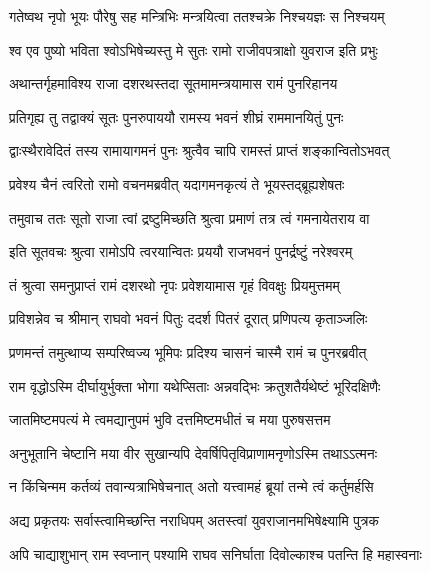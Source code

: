 
\twolineshloka
{गतेष्वथ नृपो भूयः पौरेषु सह मन्त्रिभिः}
{मन्त्रयित्वा ततश्चक्रे निश्चयज्ञः स निश्चयम्} %

\twolineshloka
{श्व एव पुष्यो भविता श्वोऽभिषेच्यस्तु मे सुतः}
{रामो राजीवपत्राक्षो युवराज इति प्रभुः} %

\twolineshloka
{अथान्तर्गृहमाविश्य राजा दशरथस्तदा}
{सूतमामन्त्रयामास रामं पुनरिहानय} %

\twolineshloka
{प्रतिगृह्य तु तद्वाक्यं सूतः पुनरुपाययौ}
{रामस्य भवनं शीघ्रं राममानयितुं पुनः} %

\twolineshloka
{द्वाःस्थैरावेदितं तस्य रामायागमनं पुनः}
{श्रुत्वैव चापि रामस्तं प्राप्तं शङ्कान्वितोऽभवत्} %

\twolineshloka
{प्रवेश्य चैनं त्वरितो रामो वचनमब्रवीत्}
{यदागमनकृत्यं ते भूयस्तद्ब्रूह्यशेषतः} %

\twolineshloka
{तमुवाच ततः सूतो राजा त्वां द्रष्टुमिच्छति}
{श्रुत्वा प्रमाणं तत्र त्वं गमनायेतराय वा} %

\twolineshloka
{इति सूतवचः श्रुत्वा रामोऽपि त्वरयान्वितः}
{प्रययौ राजभवनं पुनर्द्रष्टुं नरेश्वरम्} %

\twolineshloka
{तं श्रुत्वा समनुप्राप्तं रामं दशरथो नृपः}
{प्रवेशयामास गृहं विवक्षुः प्रियमुत्तमम्} %

\twolineshloka
{प्रविशन्नेव च श्रीमान् राघवो भवनं पितुः}
{ददर्श पितरं दूरात् प्रणिपत्य कृताञ्जलिः} %

\twolineshloka
{प्रणमन्तं तमुत्थाप्य सम्परिष्वज्य भूमिपः}
{प्रदिश्य चासनं चास्मै रामं च पुनरब्रवीत्} %

\twolineshloka
{राम वृद्धोऽस्मि दीर्घायुर्भुक्ता भोगा यथेप्सिताः}
{अन्नवद्भिः क्रतुशतैर्यथेष्टं भूरिदक्षिणैः} %

\twolineshloka
{जातमिष्टमपत्यं मे त्वमद्यानुपमं भुवि}
{दत्तमिष्टमधीतं च मया पुरुषसत्तम} %

\twolineshloka
{अनुभूतानि चेष्टानि मया वीर सुखान्यपि}
{देवर्षिपितृविप्राणामनृणोऽस्मि तथाऽऽत्मनः} %

\twolineshloka
{न किंचिन्मम कर्तव्यं तवान्यत्राभिषेचनात्}
{अतो यत्त्वामहं ब्रूयां तन्मे त्वं कर्तुमर्हसि} %

\twolineshloka
{अद्य प्रकृतयः सर्वास्त्वामिच्छन्ति नराधिपम्}
{अतस्त्वां युवराजानमभिषेक्ष्यामि पुत्रक} %

\twolineshloka
{अपि चाद्याशुभान् राम स्वप्नान् पश्यामि राघव}
{सनिर्घाता दिवोल्काश्च पतन्ति हि महास्वनाः} %

